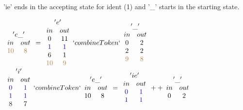 \begin{example}\label{combSplit}
'ie' ends in the accepting state for ident (1) and '\_' starts in the
starting state.
\begin{center}
$\begin{array}{cc}\multicolumn{2}{c}{'e\_'}\\
in & out\\
\textcolor{brown}{10} & \textcolor{brown}{8}\\
\end{array}
=
\begin{array}{cc}\multicolumn{2}{c}{'e'}\\
in & out\\
0 & 11\\
\textcolor{blue}{1} & \textcolor{blue}{1}\\
6 & 1\\
\textcolor{brown}{10} & \textcolor{brown}{9}\\
\end{array}
`combineToken`
\begin{array}{cc}\multicolumn{2}{c}{'\_'}\\
in & out\\
0 & 2\\
2 & 2\\
\textcolor{brown}{9} & \textcolor{brown}{8}\\
\end{array}
$\\
$\begin{array}{cc}
\multicolumn{2}{c}{'i'}\\
in & out\\
\textcolor{blue}{0} & \textcolor{blue}{1}\\
\textcolor{blue}{1} & \textcolor{blue}{1}\\
8 & 7\\
\end{array}
`combineToken`
\begin{array}{cc}\multicolumn{2}{c}{'e\_'}\\
in & out\\
10 & 8\\
\end{array}
=
\begin{array}{cc}\multicolumn{2}{c}{'ie'}\\
in & out\\
\textcolor{blue}{0} & \textcolor{blue}{1}\\
\textcolor{blue}{1} & \textcolor{blue}{1}\\
\end{array} ++ 
\begin{array}{cc}\multicolumn{2}{c}{'\_'}\\
in & out\\
0 & 2\\
\end{array}$\\
\end{center}
\end{example}
